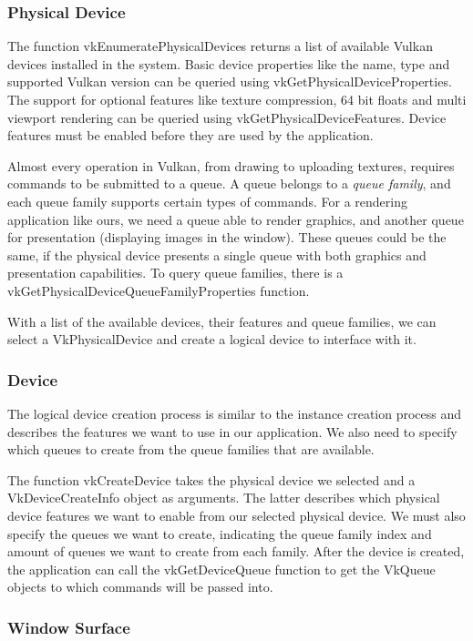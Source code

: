 \subsubsection{Physical Device}
The function vkEnumeratePhysicalDevices returns a list of available Vulkan devices installed in the system. Basic device properties like the name, type and supported Vulkan version can be queried using vkGetPhysicalDeviceProperties. The support for optional features like texture compression, 64 bit floats and multi viewport rendering can be queried using vkGetPhysicalDeviceFeatures. Device features must be enabled before they are used by the application.

Almost every operation in Vulkan, from drawing to uploading textures, requires commands to be submitted to a queue. A queue belongs to a \emph{queue family}, and each queue family supports certain types of commands. For a rendering application like ours, we need a queue able to render graphics, and another queue for presentation (displaying images in the window). These queues could be the same, if the physical device presents a single queue with both graphics and presentation capabilities. To query queue families, there is a vkGetPhysicalDeviceQueueFamilyProperties function.

With a list of the available devices, their features and queue families, we can select a VkPhysicalDevice and create a logical device to interface with it.

\subsubsection{Device}
The logical device creation process is similar to the instance creation process and describes the features we want to use in our application. We also need to specify which queues to create from the queue families that are available. 

The function vkCreateDevice takes the physical device we selected and a VkDeviceCreateInfo object as arguments. The latter describes which physical device features we want to enable from our selected physical device. We must also specify the queues we want to create, indicating the queue family index and amount of queues we want to create from each family. After the device is created, the application can call the vkGetDeviceQueue function to get the VkQueue objects to which commands will be passed into.

\subsubsection{Window Surface}

